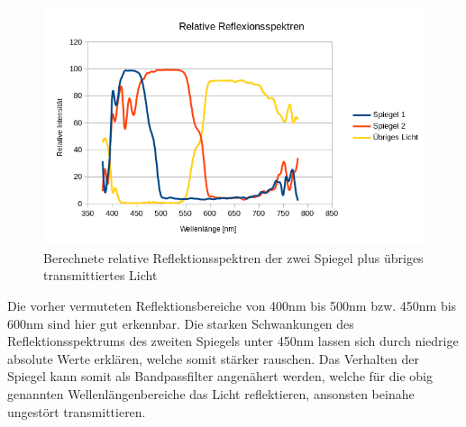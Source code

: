\begin{figure}[h]
	\centering
	\includegraphics[scale=0.8]{Images/V1_Reflexionsspektren.png}
	\caption{Berechnete relative Reflektionsspektren der zwei Spiegel plus übriges transmittiertes Licht}
	\label{V1_REFLECT}
\end{figure}

Die vorher vermuteten Reflektionsbereiche von 400nm bis 500nm bzw. 450nm bis 600nm sind hier gut erkennbar. Die starken Schwankungen des Reflektionsspektrums des zweiten Spiegels unter 450nm lassen sich durch niedrige absolute Werte erklären, welche somit stärker rauschen.
Das Verhalten der Spiegel kann somit als Bandpassfilter angenähert werden, welche für die obig genannten Wellenlängenbereiche das Licht reflektieren, ansonsten beinahe ungestört transmittieren.